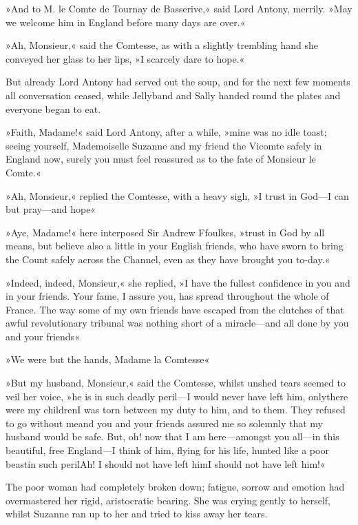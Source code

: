 »And to M. le Comte de Tournay de Basserive,« said Lord Antony, merrily. »May we welcome him in England before many days are over.«

»Ah, Monsieur,« said the Comtesse, as with a slightly trembling hand she conveyed her glass to her lips, »I scarcely dare to hope.«

But already Lord Antony had served out the soup, and for the next few moments all conversation ceased, while Jellyband and Sally handed round the plates and everyone began to eat.

»Faith, Madame!« said Lord Antony, after a while, »mine was no idle toast; seeing yourself, Mademoiselle Suzanne and my friend the Vicomte safely in England now, surely you must feel reassured as to the fate of Monsieur le Comte.«

»Ah, Monsieur,« replied the Comtesse, with a heavy sigh, »I trust in God—I can but pray—and hope\textellipsis«

»Aye, Madame!« here interposed Sir Andrew Ffoulkes, »trust in God by all means, but believe also a little in your English friends, who have sworn to bring the Count safely across the Channel, even as they have brought you to-day.«

»Indeed, indeed, Monsieur,« she replied, »I have the fullest confidence in you and in your friends. Your fame, I assure you, has spread throughout the whole of France. The way some of my own friends have escaped from the clutches of that awful revolutionary tribunal was nothing short of a miracle—and all done by you and your  friends\longdash«

»We were but the hands, Madame la Comtesse\textellipsis«

»But my husband, Monsieur,« said the Comtesse, whilst unshed tears seemed to veil her voice, »he is in such deadly peril—I would never have left him, only\textellipsis \allowbreak  there were my children\textellipsis \allowbreak  I was torn between my duty to him, and to them. They refused to go without me\textellipsis \allowbreak  and you and your friends assured me so solemnly that my husband would be safe. But, oh! now that I am here—amongst you all—in this beautiful, free England—I think of him, flying for his life, hunted like a poor beast\textellipsis \allowbreak  in such peril\textellipsis \allowbreak  Ah! I should not have left him\textellipsis \allowbreak  I should not have left him!\textellipsis«

The poor woman had completely broken down; fatigue, sorrow and emotion had overmastered her rigid, aristocratic bearing. She was crying gently to herself, whilst Suzanne ran up to her and tried to kiss away her tears.

